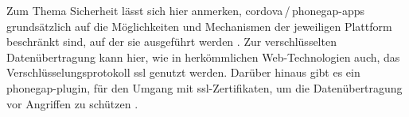 



Zum Thema Sicherheit lässt sich hier anmerken, \gls{cordova}\,/\,\gls{phonegap}-\glspl{app} grundsätzlich auf die Möglichkeiten und Mechanismen der jeweiligen Plattform beschränkt sind, auf der sie ausgeführt werden \cite{phonegap_security}.
Zur verschlüsselten Datenübertragung kann hier, wie in herkömmlichen Web-Technologien auch, das Verschlüsselungsprotokoll \gls{ssl} genutzt werden.
Darüber hinaus gibt es ein \gls{phonegap}-\gls{plugin}, für den Umgang mit \gls{ssl}-Zertifikaten, um die Datenübertragung vor Angriffen zu schützen \cite{phonegap_ssl_checker}.
























